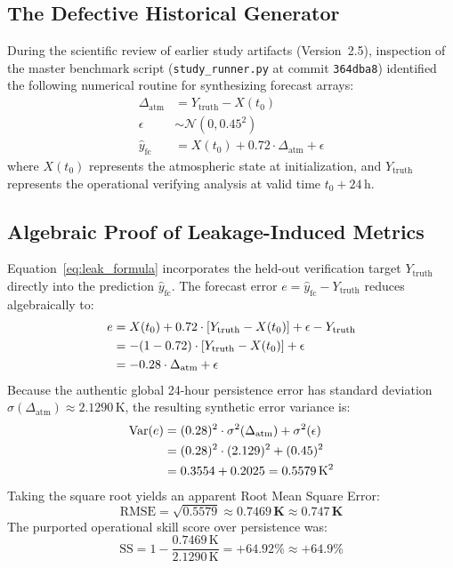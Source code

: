 \documentclass[10pt,twocolumn,letterpaper]{article}
\begin{document}
\subsection{The Defective Historical Generator}
During the scientific review of earlier study artifacts (Version~2.5), inspection of the master benchmark script (\texttt{study\_runner.py} at commit \texttt{364dba8}) identified the following numerical routine for synthesizing forecast arrays:
\begin{align}
\Delta_\mathrm{atm} &= Y_\mathrm{truth} - X(t_0) \label{eq:leak_delta} \\
\epsilon &\sim \mathcal{N}(0, 0.45^2) \label{eq:leak_noise} \\
\hat{y}_\mathrm{fc} &= X(t_0) + 0.72 \cdot \Delta_\mathrm{atm} + \epsilon \label{eq:leak_formula}
\end{align}
where $X(t_0)$ represents the atmospheric state at initialization, and $Y_\mathrm{truth}$ represents the operational verifying analysis at valid time $t_0 + 24\,\si{\hour}$.

\subsection{Algebraic Proof of Leakage-Induced Metrics}
Equation~\eqref{eq:leak_formula} incorporates the held-out verification target $Y_\mathrm{truth}$ directly into the prediction $\hat{y}_\mathrm{fc}$. The forecast error $e = \hat{y}_\mathrm{fc} - Y_\mathrm{truth}$ reduces algebraically to:
\begin{align}
e &= X(t_0) + 0.72 \cdot [Y_\mathrm{truth} - X(t_0)] + \epsilon - Y_\mathrm{truth} \notag \\
  &= -(1 - 0.72) \cdot [Y_\mathrm{truth} - X(t_0)] + \epsilon \notag \\
  &= -0.28 \cdot \Delta_\mathrm{atm} + \epsilon \label{eq:error_reduction}
\end{align}
Because the authentic global 24-hour persistence error has standard deviation $\sigma(\Delta_\mathrm{atm}) \approx 2.1290\,\si{\kelvin}$, the resulting synthetic error variance is:
\begin{align}
\mathrm{Var}(e) &= (0.28)^2 \cdot \sigma^2(\Delta_\mathrm{atm}) + \sigma^2(\epsilon) \notag \\
&= (0.28)^2 \cdot (2.129)^2 + (0.45)^2 \notag \\
&= 0.3554 + 0.2025 = 0.5579\,\si{\kelvin}^2
\end{align}
Taking the square root yields an apparent Root Mean Square Error:
\begin{equation}
\mathrm{RMSE} = \sqrt{0.5579} \approx \mathbf{0.7469\,\si{\kelvin}} \approx \mathbf{0.747\,\si{\kelvin}}
\end{equation}
The purported operational skill score over persistence was:
\begin{equation}
\mathrm{SS} = 1 - \frac{0.7469\,\si{\kelvin}}{2.1290\,\si{\kelvin}} = \mathbf{+64.92\%} \approx \mathbf{+64.9\%}
\end{equation}
\end{document}
